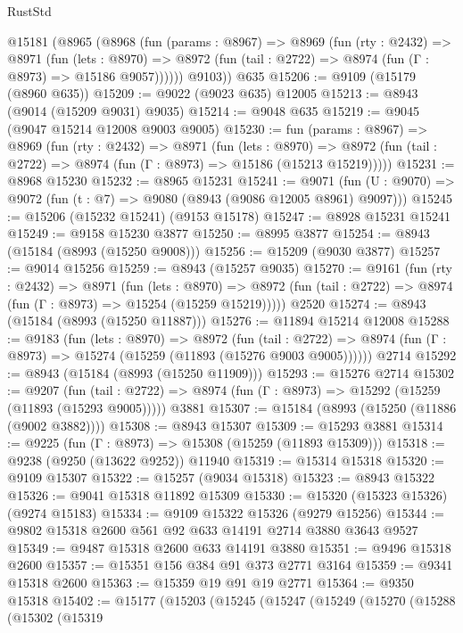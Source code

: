 \begin{lexlean}{RustStd}
\begin{coremodule}
    @15181
      (@8965
        (@8968
          (fun (params : @8967) =>
          @8969
            (fun (rty : @2432) =>
            @8971
              (fun (lets : @8970) =>
              @8972 (fun (tail : @2722) => @8974 (fun (Γ : @8973) => @15186 @9057))))))
        @9103))
    @635
@15206 := @9109 (@15179 (@8960 @635))
@15209 := @9022 (@9023 @635) @12005
@15213 := @8943 (@9014 (@15209 @9031) @9035)
@15214 := @9048 @635
@15219 := @9045 (@9047 @15214 @12008 @9003 @9005)
@15230 := fun (params : @8967) =>
  @8969
    (fun (rty : @2432) =>
    @8971
      (fun (lets : @8970) =>
      @8972 (fun (tail : @2722) => @8974 (fun (Γ : @8973) => @15186 (@15213 @15219)))))
@15231 := @8968 @15230
@15232 := @8965 @15231
@15241 := @9071
    (fun (U : @9070) => @9072 (fun (t : @7) => @9080 (@8943 (@9086 @12005 @8961) @9097)))
@15245 := @15206 (@15232 @15241) (@9153 @15178)
@15247 := @8928 @15231 @15241
@15249 := @9158 @15230 @3877
@15250 := @8995 @3877
@15254 := @8943 (@15184 (@8993 (@15250 @9008)))
@15256 := @15209 (@9030 @3877)
@15257 := @9014 @15256
@15259 := @8943 (@15257 @9035)
@15270 := @9161
    (fun (rty : @2432) =>
    @8971
      (fun (lets : @8970) =>
      @8972 (fun (tail : @2722) => @8974 (fun (Γ : @8973) => @15254 (@15259 @15219)))))
    @2520
@15274 := @8943 (@15184 (@8993 (@15250 @11887)))
@15276 := @11894 @15214 @12008
@15288 := @9183
    (fun (lets : @8970) =>
    @8972
      (fun (tail : @2722) =>
      @8974 (fun (Γ : @8973) => @15274 (@15259 (@11893 (@15276 @9003 @9005))))))
    @2714
@15292 := @8943 (@15184 (@8993 (@15250 @11909)))
@15293 := @15276 @2714
@15302 := @9207
    (fun (tail : @2722) => @8974 (fun (Γ : @8973) => @15292 (@15259 (@11893 (@15293 @9005)))))
    @3881
@15307 := @15184 (@8993 (@15250 (@11886 (@9002 @3882))))
@15308 := @8943 @15307
@15309 := @15293 @3881
@15314 := @9225 (fun (Γ : @8973) => @15308 (@15259 (@11893 @15309)))
@15318 := @9238 (@9250 (@13622 @9252)) @11940
@15319 := @15314 @15318
@15320 := @9109 @15307
@15322 := @15257 (@9034 @15318)
@15323 := @8943 @15322
@15326 := @9041 @15318 @11892 @15309
@15330 := @15320 (@15323 @15326) (@9274 @15183)
@15334 := @9109 @15322 @15326 (@9279 @15256)
@15344 := @9802 @15318 @2600 @561 @92 @633 @14191 @2714 @3880 @3643 @9527
@15349 := @9487 @15318 @2600 @633 @14191 @3880
@15351 := @9496 @15318 @2600
@15357 := @15351 @156 @384 @91 @373 @2771 @3164
@15359 := @9341 @15318 @2600
@15363 := @15359 @19 @91 @19 @2771
@15364 := @9350 @15318
@15402 := @15177
    (@15203
      (@15245
        (@15247
          (@15249
            (@15270
              (@15288
                (@15302
                  (@15319

\end{coremodule}
\end{lexlean}
